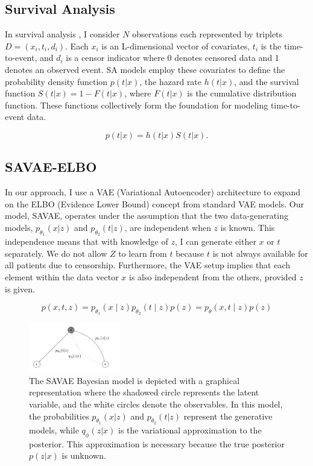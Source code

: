 \documentclass{article}
\begin{document}
\subsection{Survival Analysis}
In survival analysis \cite{clark2003survival}, I consider \(N\) observations each represented by triplets \(D = (x_i, t_i, d_i)\). Each \(x_i\) is an L-dimensional vector of covariates, \(t_i\) is the time-to-event, and \(d_i\) is a censor indicator where 0 denotes censored data and 1 denotes an observed event. SA models employ these covariates to define the probability density function \(p(t|x)\), the hazard rate \(h(t|x)\), and the survival function \(S(t|x) = 1 - F(t|x)\), where \(F(t|x)\) is the cumulative distribution function. These functions collectively form the foundation for modeling time-to-event data.


\begin{equation}
p(t|x) = h(t|x)S(t|x).
\end{equation}

\subsection{SAVAE-ELBO}
In our approach, I use a VAE (Variational Autoencoder) architecture to expand on the ELBO (Evidence Lower Bound) concept from standard VAE models. Our model, SAVAE, operates under the assumption that the two data-generating models,  \( p_{\theta_1} (x|z) \) and \( p_{\theta_2} (t|z) \),  are independent when \( z \) is known. This independence means that with knowledge of \( z \), I can generate either \( x \) or \( t \) separately. We do not allow \( Z \) to learn from \( t \) because \( t \) is not always available for all patients due to censorship. Furthermore, the VAE setup implies that each element within the data vector \( x \) is also independent from the others, provided \( z \) is given.

\begin{equation}
    p(x, t, z) = p_{\theta_1}(x \mid z) p_{\theta_2}(t \mid z) p(z) = p_{\theta}(x, t \mid z) p(z) 
\end{equation}

\begin{figure}[H]
    \centering
    \includegraphics[width=4cm]{figures/SAVAE.png}
    \caption{The SAVAE Bayesian model is depicted with a graphical representation where the shadowed circle represents the latent variable, and the white circles denote the observables. In this model, the probabilities \(p_{\theta_1}(x|z)\) and \(p_{\theta_2}(t|z)\) represent the generative models, while \(q_\phi(z|x)\) is the variational approximation to the posterior. This approximation is necessary because the true posterior \(p(z|x)\) is unknown.
}
    \label{SAVAE}
\end{figure}
\end{document}
